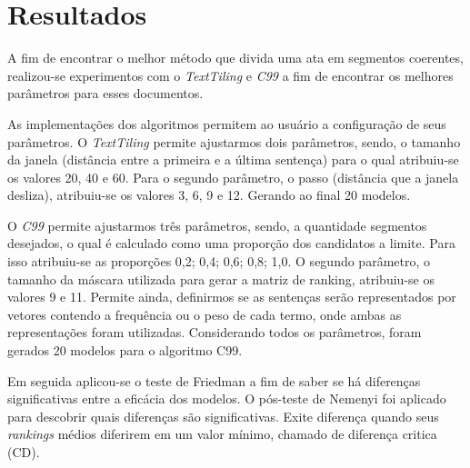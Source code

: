 \section{Resultados}
	\label{sec:resultados}

A fim de encontrar o melhor método que divida uma ata em segmentos coerentes, realizou-se experimentos com o \textit{TextTiling} e \textit{C99} a fim de encontrar os melhores parâmetros para esses documentos.


As implementações dos algoritmos permitem ao usuário a configuração de seus parâmetros. 
%
O \textit{TextTiling} permite ajustarmos dois parâmetros, sendo, o tamanho da janela (distância entre a primeira e a última sentença) para o qual atribuiu-se os valores 20, 40 e 60. Para o segundo parâmetro, o passo (distância que a janela desliza), atribuiu-se os valores 3, 6, 9 e 12. Gerando ao final 20 modelos.
%

O \textit{C99} permite ajustarmos três parâmetros, sendo, a quantidade segmentos desejados, o qual é calculado como uma proporção dos candidatos a limite. Para isso atribuiu-se as proporções {0,2; 0,4; 0,6; 0,8; 1,0}. O segundo parâmetro, o tamanho da máscara utilizada para gerar a matriz de ranking, atribuiu-se os valores 9 e 11. Permite ainda, definirmos se as sentenças serão representados por vetores contendo a frequência ou o peso de cada termo, onde ambas as representações foram utilizadas.
%
 Considerando todos os parâmetros, foram gerados 20 modelos para o algoritmo C99.%







Em seguida aplicou-se o teste de Friedman a fim de saber se há diferenças significativas entre a eficácia dos modelos. O pós-teste de Nemenyi foi aplicado para descobrir quais diferenças são significativas. 
%
Exite diferença quando seus \textit{rankings} médios diferirem em um valor mínimo, chamado de diferença critica (CD). 
%

